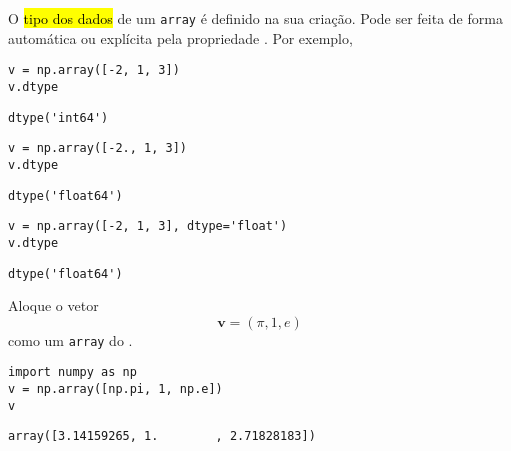 O \hl{tipo dos dados} de um \lstinline+array+ é definido na sua criação. Pode ser feita de forma automática ou explícita pela propriedade {\PYTHONnumpyDOTdtype}. Por exemplo,

\begin{lstlisting}
v = np.array([-2, 1, 3])
v.dtype
\end{lstlisting}

\begin{verbatim}
dtype('int64')
\end{verbatim}

\begin{lstlisting}
v = np.array([-2., 1, 3])
v.dtype
\end{lstlisting}

\begin{verbatim}
dtype('float64')
\end{verbatim}

\begin{lstlisting}
v = np.array([-2, 1, 3], dtype='float')
v.dtype
\end{lstlisting}

\begin{verbatim}
dtype('float64')
\end{verbatim}


\begin{ex}
  Aloque o vetor
  \begin{equation}
    \pmb{v} = (\pi, 1, e)
  \end{equation}
  como um \lstinline+array+ do {\numpy}.

\begin{lstlisting}
import numpy as np
v = np.array([np.pi, 1, np.e])
v
\end{lstlisting}

\begin{verbatim}
array([3.14159265, 1.        , 2.71828183])
\end{verbatim}

\end{ex}

